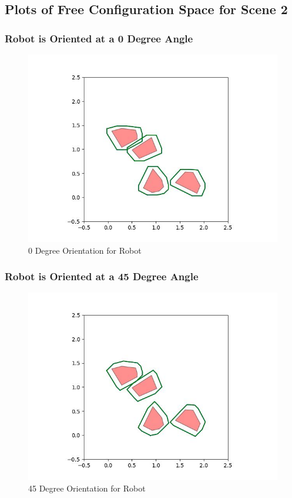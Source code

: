 \documentclass{article}
\begin{document}
\newpage
\subsection{Plots of Free Configuration Space for Scene 2}
\subsubsection{Robot is Oriented at a 0 Degree Angle}
\begin{figure}[h!]
	\includegraphics[width= 0.9 \linewidth]{Problem3_minkowski2_0.jpg}
	\centering
	\caption{0 Degree Orientation for Robot}
	\label{Problem3_minkowski2_0.jpg}
\end{figure}

\newpage
\subsubsection{Robot is Oriented at a 45 Degree Angle}
\begin{figure}[h!]
	\includegraphics[width= 0.9 \linewidth]{Problem3_minkowski2_45.jpg}
	\centering
	\caption{45 Degree Orientation for Robot}
	\label{Problem3_minkowski2_45.jpg}
\end{figure}
\end{document}
